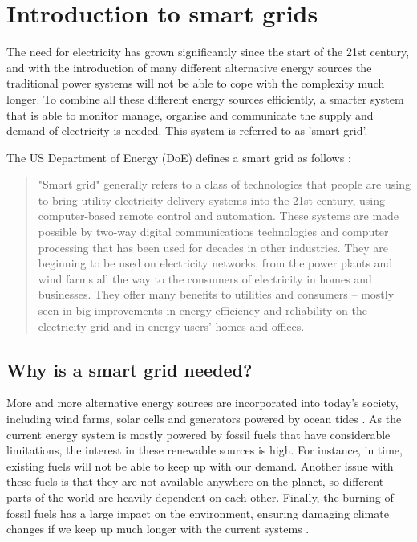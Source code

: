 \section{Introduction to smart grids}
The need for electricity has grown significantly since the start of the 21st century, and with the introduction of many different alternative energy sources the traditional power systems will not be able to cope with the complexity much longer. To combine all these different energy sources efficiently, a smarter system that is able to monitor manage, organise and communicate the supply and demand of electricity is needed. This system is referred to as 'smart grid'. 

The US Department of Energy (DoE) defines a smart grid as follows \cite{doe}:
\begin{quote}
"Smart grid" generally refers to a class of technologies that people are using to bring utility electricity delivery systems into the 21st century, using computer-based remote control and automation. These systems are made possible by two-way digital communications technologies and computer processing that has been used for decades in other industries. They are beginning to be used on electricity networks, from the power plants and wind farms all the way to the consumers of electricity in homes and businesses. They offer many benefits to utilities and consumers -- mostly seen in big improvements in energy efficiency and reliability on the electricity grid and in energy users' homes and offices.
\end{quote}

\subsection{Why is a smart grid needed?}
More and more alternative energy sources are incorporated into today's society, including wind farms, solar cells and generators powered by ocean tides \cite{Tromly2001}. As the current energy system is mostly powered by fossil fuels that have considerable limitations, the interest in these renewable sources is high. For instance, in time, existing fuels will not be able to keep up with our demand. Another issue with these fuels is that they are not available anywhere on the planet, so different parts of the world are heavily dependent on each other. Finally, the burning of fossil fuels has a large impact on the environment, ensuring damaging  climate changes if we keep up much longer with the current systems \cite{friedman2008hot}. 

